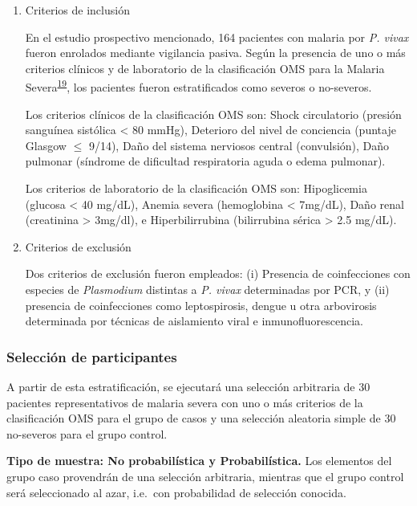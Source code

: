 \documentclass[a4paper]{article}
\begin{document}
\begin{enumerate}
\def\labelenumi{\alph{enumi}.}
\item
  Criterios de inclusión

  En el estudio prospectivo mencionado, 164 pacientes con malaria por
  \emph{P. vivax} fueron enrolados mediante vigilancia pasiva. Según la
  presencia de uno o más criterios clínicos y de laboratorio de la
  clasificación OMS para la Malaria
  Severa\textsuperscript{\protect\hyperlink{ref-WHO2014severe}{19}}, los
  pacientes fueron estratificados como severos o no-severos.

  Los criterios clínicos de la clasificación OMS son: Shock circulatorio
  (presión sanguínea sistólica \textless{} 80 mmHg), Deterioro del nivel
  de conciencia (puntaje Glasgow \(\le\) 9/14), Daño del sistema
  nerviosos central (convulsión), Daño pulmonar (síndrome de dificultad
  respiratoria aguda o edema pulmonar).

  Los criterios de laboratorio de la clasificación OMS son: Hipoglicemia
  (glucosa \textless{} 40 mg/dL), Anemia severa (hemoglobina \textless{}
  7mg/dL), Daño renal (creatinina \textgreater{} 3mg/dl), e
  Hiperbilirrubina (bilirrubina sérica \textgreater{} 2.5 mg/dL). 
\item
  Criterios de exclusión

  Dos criterios de exclusión fueron empleados: (i) Presencia de
  coinfecciones con especies de \emph{Plasmodium} distintas a \emph{P.
  vivax} determinadas por PCR, y (ii) presencia de coinfecciones como
  leptospirosis, dengue u otra arbovirosis determinada por técnicas de
  aislamiento viral e inmunofluorescencia. 
\end{enumerate}

\subsubsection{Selección de
participantes}\label{seleccion-de-participantes}

A partir de esta estratificación, se ejecutará una selección arbitraria
de 30 pacientes representativos de malaria severa con uno o más
criterios de la clasificación OMS para el grupo de casos y una selección
aleatoria simple de 30 no-severos para el grupo control.

\textbf{Tipo de muestra: No probabilística y Probabilística.} Los
elementos del grupo caso provendrán de una selección arbitraria,
mientras que el grupo control será seleccionado al azar, i.e.~con
probabilidad de selección conocida.
\end{document}
